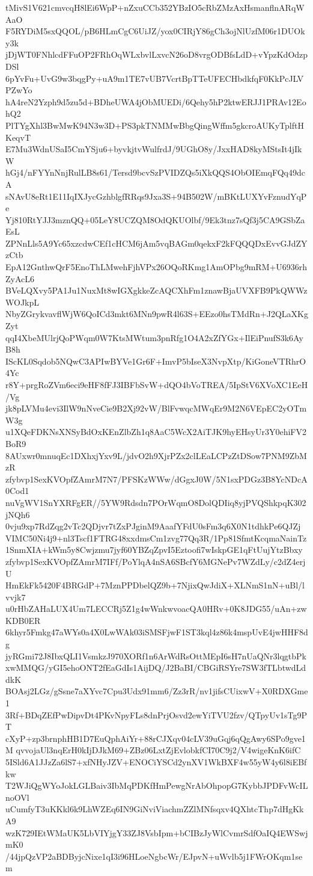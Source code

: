 tMivS1V621cmvcqH8lEi6WpP+nZxuCCb352YBzIO5cRbZMzAxHsmanflnARqWAaO
F5RYDiM5sxQQOL/pB6HLmCgC6UiJZ/yox0CIRjY86gCh3ojNlUzfM06r1DUOky3k
jDjWT0FNhlcdFFuOP2FRhOqWLxbvlLxvcN26oD8vrgODBfsLdD+vYpzKdOdzpDSl
6pYvFu+UvG9w3bqgPy+uA9m1TE7vUB7VcrtBpTTeUFECHbdkfqF0KkPcJLVPZwYo
hA4reN2Yzph9d5zu5d+BDheUWA4jObMUEDi/6Qehy5hP2ktwERJJ1PRAv12EohQ2
PlTYgXhl3BwMwK94N3w3D+PS3pkTNMMwBbgQingWffm5gkcroAUKyTplftHKeqvT
E7Mu3WdnUSaI5CmYSju6+byvkjtvWulfrdJ/9UGhO8y/JxxHAD8kyMStsIt4jIkW
hGj4/nFYYnNnjRulLB8s61/Tersd9bcvSzPVIDZQs5iXkQQS4ObOIEmqFQq49dcA
sNAvU8eRt1E11IqIXJycGzhblgfRRqs9Jxa3S+94B502W/mBKtLUXYvFznudYqPe
Yj810RtYJJ3mznQQ+05LeY8UCZQM8OdQKUOlbf/9Ek3tnz7sQf3j5CA9GSbZaEsL
ZPNnLls5A9Yc65xzcdwCEf1cHCM6jAm5vqBAGm0qekxF2kFQQQDxEvvGJdZYzCtb
EpA12GnthwQrF5EnoThLMwehFjhVPx26OQoRKmg1AmOPbg9mRM+U6936rhZyAcL6
BVeLQXvy5PA1Ju1NuxMt8wIGXgkkeZcAQCXhFm1znawBjaUVXFB9PkQWWzWOJkpL
NbyZGrykvavflWjW6QoICd3mkt6MNn9pwR4l63S+EEzo0hsTMdRn+J2QLaXKgZyt
qqI4XbeMUlrjQoPWqm0W7KtsMWtum3pnRfg1O4A2xZfYGx+IlEiPnufS3k6AyB8h
IScKL0Sqdob5NQwC3APIwBYVe1Gr6F+ImvP5bIseX3NvpXtp/KiGoneVTRhrO4Yc
r8Y+prgRoZVm6eci9eHF8fFJ3IBFbSvW+dQO4bVoTREA/5IpStV6XVoXC1EeH/Vg
jk8pLVMu4evi3IlW9nNveCie9B2Xj92vW/BlFvwqcMWqEr9M2N6VEpEC2yOTmW3g
u1XQeFDKNsXNSyBdOxKEnZlbZh1q8AaC5WcX2AiTJK9hyEHsyUr3Y0ehiFV2BoR9
8AUxwr0mnuqEc1DXhxjYxv9L/jdvO2h9XjrPZx2clLEaLCPzZtDSow7PNM9ZbMzR
zfybvp1SexKVOpfZAmrM7N7/PFSKzWWw/dGgxJ0W/5N1sxPDGz3B8YcNDcA0Cod1
nuVgWV1SnYXRFgER//5YW9Rdsdn7POrWqmO8DolQDIiq8yjPVQShkpqK302jNQh6
0vju9xp7RdZqg2vTc2QDjvr7tZxPJginM9AaafYFdU0sFm3q6X0N1tdhkPe6QJZj
VIMC50Ni4j9+nl3Tscf1FTRG48xxdmsCm1zvg77Qq3R/1Pp81SfmtKcqmaNainTz
1SnmXIA+kWm5y8Cwjzmu7jyf60YBZqZpvI5Eztoofi7wIskpGE1qFtUujYtzBbxy
zfybvp1SexKVOpfZAmrM7IFf/PoYlqA4nSA6SBcfY6MGNePv7WZdLy/c2dZ4erjU
HmEkFk5420F4BRGdP+7MznPPDbelQZ9b+7NjixQwJdiX+XLNmS1nN+uBl/lvvjk7
u0rHbZAHaLUX4Um7LECCRj5Z1g4wWnkwvoacQA0HRv+0K8JDG55/uAn+zwKDB0ER
6khyr5Fmkg47aWYs0a4X0LwWAk03iSMSFjwF1ST3kql4z86k4mspUvE4jwHHF8dg
jyRGmi72J8IbxQLI1VsmkzJ970XORf1n6ArWdRsOttMEpI6sH7nUaQNr3lqgtbPk
xwMMQG/yGI5ehoONT2fEaGdIs1AijDQ/J2BaBI/CBGiRSYre7SW3fTLbtwdLddkK
BOAsj2LGz/gSsne7aXYvc7Cpu3Udx91mm6/Zz3rR/nv1jifsCUixwV+X0RDXGme1
3Rf+BDqZEfPwDipvDt4PKvNpyFLs8dnPrjOsvd2ewYiTVU2fzv/QTpyUv1sTg9PT
cXyP+zp3brnphHB1D7EuQphAiYr+88rCJXqv04cLV39uGqj6qQgAwy6SPo9gve1M
qvvojaUl3nqErH0kIjDJkM69+ZBz06LxtZjEvlobkfCI70C9j2/V4wigeKnK6ifC
5ISld6A1JJzZa6lS7+xfNHyJZV+ENOCiYSCd2ynXV1WkBXF4w55yW4y6l8iEBfkw
T2WJiQgWYoJokLGLBaiv3IbMqPDKfHmPewgNrAbOhpopG7KybbJPDFvWcILnoOVl
uCumfyT3uKKkl6k9LhWZEq6IN9GiNviViachmZZlMNfsqxv4QXhtcThp7dHgKkA9
wzK729IEtWMaUK5LbVIYjgY33ZJ8VsbIpm+bCIBzJyWlCvmrSdfOaIQ4EWSwjmK0
/44jpQzVP2aBDByjcNixe1qI3i96HLoeNgbcWr/EJpvN+uWvlb5j1FWrOKqm1sem
